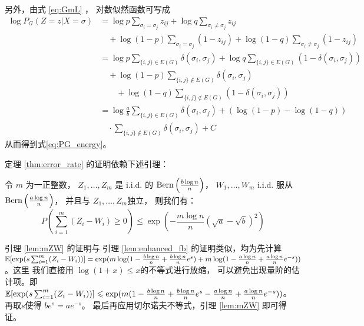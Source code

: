 另外，由式 \eqref{eq:GmL} ，
对数似然函数可写成
\begin{align*}
  \log P_G(Z=z|X=\sigma)
  &= \log p \sum_{\sigma_i = \sigma_j} z_{ij}
  +\log q \sum_{\sigma_i \neq \sigma_j}z_{ij}\\
  &\quad +\log (1-p) \sum_{\sigma_i = \sigma_j}(1-z_{ij})
  +\log (1-q) \sum_{\sigma_i \neq \sigma_j}(1-z_{ij})\\
  &= \log p \sum_{\{i,j\}\in E(G)}
  \delta(\sigma_i, \sigma_j) +
  \log q \sum_{\{i,j\}\in E(G)}(1-\delta(\sigma_i, \sigma_j))\\
  &\quad+\log (1-p) \sum_{\{i,j\}\not\in E(G)}
  \delta(\sigma_i, \sigma_j)\\
  &\quad\quad
  +\log (1-q) \sum_{\{i,j\}\not\in E(G)}
  (1-\delta(\sigma_i, \sigma_j))\\
  &=\log \frac{a}{b} \sum_{\{i,j\}\in E(G)}
  \delta(\sigma_i, \sigma_j) + (\log(1-p)-\log(1-q)) \\
  &\quad\cdot
  \sum_{\{i,j\}\not \in E(G)}
  \delta(\sigma_i, \sigma_j)+ C
\end{align*}
从而得到式\eqref{eq:PG_energy}。

定理 \ref{thm:error_rate} 的证明依赖下述引理：
\begin{lemma}\label{lem:mZW}
	令 $m$ 为一正整数，
	$Z_1, \dots, Z_m$
  是 i.i.d. 的 $\operatorname{Bern}\left(\frac{b \log n}{n}\right)$，
  $W_1, \dots, W_m$  i.i.d. 服从 $\operatorname{Bern}\left(\frac{a \log n}{n}\right)$，
  并且与 $Z_1, \dots, Z_m$独立，
	则我们有：
\begin{equation}
	P(\sum_{i=1}^m (Z_i  - W_i) \geq 0) \leq 
  \exp\left(-\frac{m \log n}{n} \left(\sqrt{a} - \sqrt{b} \right)^2 \right)
	\end{equation}
\end{lemma}
引理 \ref{lem:mZW} 的证明与
引理 \ref{lem:enhanced_fb} 的证明类似，均为先计算
$\operatorname{\mathbb{E}}[\exp(s \sum_{i=1}^m (Z_i - W_i))]
=\exp(m \log(1-\frac{b \log n}{n} + \frac{b \log n}{n} e^s) + m \log(1-\frac{a \log n}{n} + \frac{a \log n}{n} e^{-s}))$。这里
我们直接用 $\log(1+x)\leq x$的不等式进行放缩，
可以避免出现量阶的估计项。即
$\operatorname{\mathbb{E}}[\exp(s \sum_{i=1}^m (Z_i - W_i))]
\leqslant \exp(m(1-\frac{b \log n}{n} + \frac{b \log n}{n} e^s - \frac{a \log n}{n} + \frac{a \log n}{n} e^{-s}))$。
再取$s$使得 $be^s=ae^{-s}$。
最后再应用切尔诺夫不等式，引理 \ref{lem:mZW} 即可得证。

